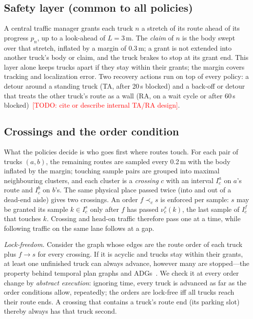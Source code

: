 \documentclass[conference]{IEEEtran}
\newcommand{\todo}[1]{\textcolor{red}{[TODO: #1]}}
\begin{document}
\subsection{Safety layer (common to all policies)}
A central traffic manager grants each truck $n$ a stretch of its route ahead
of its progress $p_n$, up to a look-ahead of $L=3$\,m. The \emph{claim} of $n$
is the body swept over that stretch, inflated by a margin of 0.3\,m; a grant
is not extended into another truck's body or claim, and the truck brakes to
stop at its grant end. This layer alone keeps trucks apart if they stay within
their grants; the margin covers tracking and localization error. Two recovery
actions run on top of every policy: a detour around a standing truck (TA,
after 20\,s blocked) and a back-off or detour that treats the other truck's
route as a wall (RA, on a wait cycle or after 60\,s blocked)~\todo{cite or
describe internal TA/RA design}.

\subsection{Crossings and the order condition}
What the policies decide is who goes first where routes touch. For each pair of
trucks $(a,b)$, the remaining routes are sampled every 0.2\,m with the body
inflated by the margin; touching sample pairs are grouped into maximal
neighbouring clusters, and each cluster is a \emph{crossing} $c$ with an
interval $I_c^a$ on $a$'s route and $I_c^b$ on $b$'s. The same physical place
passed twice (into and out of a dead-end aisle) gives two crossings. An order
$f\prec_c s$ is enforced per sample: $s$ may be granted its sample $k\in
I_c^s$ only after $f$ has passed $\nu_c^s(k)$, the last sample of $I_c^f$
that touches $k$. Crossing and head-on traffic therefore pass one at a time,
while following traffic on the same lane follows at a gap.

\emph{Lock-freedom.} Consider the graph whose edges are the route order of each
truck plus $f\to s$ for every crossing. If it is acyclic and trucks stay
within their grants, at least one unfinished truck can always advance,
however many are stopped---the property behind temporal plan graphs and
ADGs~\cite{honig2016,honig2019}. We check it at every order change by
\emph{abstract execution}: ignoring time, every truck is advanced as far as
the order conditions allow, repeatedly; the orders are lock-free iff all
trucks reach their route ends. A crossing that contains a truck's route end
(its parking slot) thereby always has that truck second.
\end{document}
